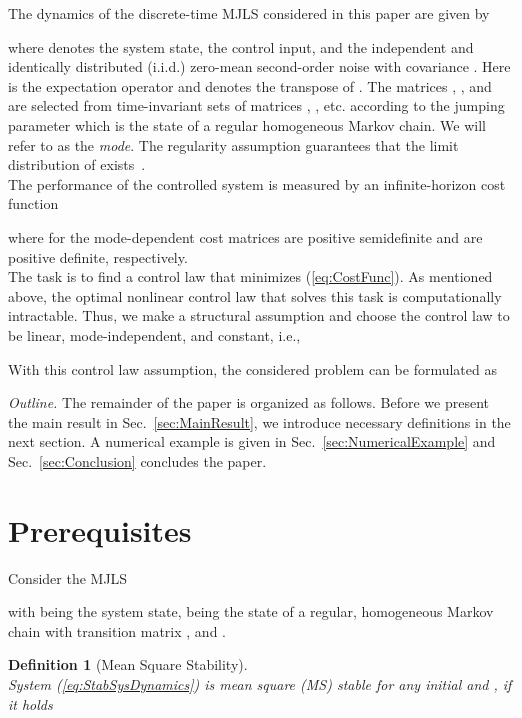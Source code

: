 \documentclass[preprint,1p,11pt]{IR-Template/ISAS_IR}
\newtheorem{definition}{Definition}
\begin{document}
The dynamics of the discrete-time MJLS considered in this paper are given by

where  denotes the system state,  the control input, and  the independent and identically distributed (i.i.d.) zero-mean second-order noise with covariance . Here  is the expectation operator and  denotes the transpose of . The matrices , , and  are selected from time-invariant sets of matrices , , etc. according to the jumping parameter  which is the state of a regular homogeneous Markov chain. We will refer to  as the \emph{mode}. The regularity assumption guarantees that the limit distribution  of  exists~\cite{Grinstead_2003}.\\

The performance of the controlled system is measured by an infinite-horizon cost function

where for  the mode-dependent cost matrices  are positive semidefinite and  are positive definite, respectively.\\

The task is to find a control law that minimizes (\ref{eq:CostFunc}). As mentioned above, the optimal nonlinear control law that solves this task is computationally intractable. Thus, we make a structural assumption and choose the control law to be linear, mode-independent, and constant, i.e.,

With this control law assumption, the considered problem can be formulated as


\emph{Outline.} The remainder of the paper is organized as follows. Before we present the main result in Sec.~\ref{sec:MainResult}, we introduce necessary definitions in the next section. A numerical example is given in Sec.~\ref{sec:NumericalExample} and Sec.~\ref{sec:Conclusion} concludes the paper.
    
   \section{Prerequisites}
   	\label{sec:Definitions}
   	Consider the MJLS 

with  being the system state,  being the state of a regular, homogeneous Markov chain with transition matrix , and .
\begin{definition}[Mean Square Stability]\hfill\\
System (\ref{eq:StabSysDynamics}) is mean square (MS) stable for any initial  and , if it holds

\label{def:MSS}
\end{definition}
\end{document}
